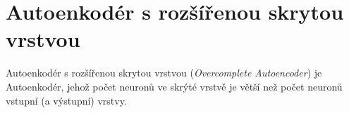 \section{Autoenkodér s rozšířenou skrytou vrstvou}
\label{sec:overcomplete_autoencoder}
Autoenkodér s rozšířenou skrytou vrstvou (\emph{Overcomplete Autoencoder}) je Autoenkodér, jehož počet neuronů ve skrýté vrstvě je větší než počet neuronů vstupní (a výstupní) vrstvy.
